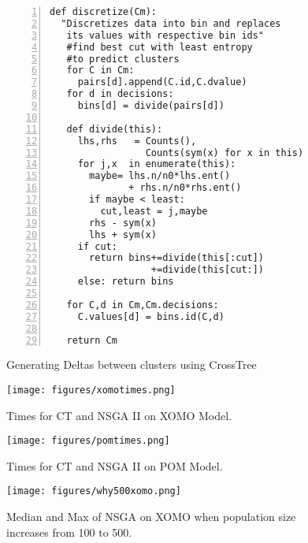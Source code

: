 \documentclass[11pt,twocolumn]{article}
\begin{document}
\begin{figure}[!b]
\begin{center}
\begin{lstlisting}[mathescape,frame=l,numbers=left]
def discretize(Cm):
  "Discretizes data into bin and replaces 
   its values with respective bin ids"
   #find best cut with least entropy 
   #to predict clusters
   for C in Cm:
     pairs[d].append(C.id,C.dvalue)
   for d in decisions:
     bins[d] = divide(pairs[d])

   def divide(this):
     lhs,rhs   = Counts(),
                 Counts(sym(x) for x in this)
     for j,x  in enumerate(this): 
       maybe= lhs.n/n0*lhs.ent()  
              + rhs.n/n0*rhs.ent()
       if maybe < least:
         cut,least = j,maybe
       rhs - sym(x)
       lhs + sym(x)
     if cut:
       return bins+=divide(this[:cut])
                  +=divide(this[cut:])
     else: return bins

   for C,d in Cm,Cm.decisions:
     C.values[d] = bins.id(C,d)

   return Cm
\end{lstlisting}
\end{center}
\caption{Generating Deltas between clusters using CrossTree}
\label{fig:crosstrees}   
\end{figure}


\begin{figure}
\begin{center}
\texttt{[image: figures/xomotimes.png]}
\end{center}
\caption[CT vs. NSGA II XOMO]{ Times for CT and NSGA II on XOMO Model.}
\label{fig:xomotimes}
\end{figure}


\begin{figure}
\begin{center}
\texttt{[image: figures/pomtimes.png]}
\end{center}
\caption[CT vs. NSGA II POM]{ Times for CT and NSGA II on POM Model.}
\label{fig:pomtimes}
\end{figure}


\begin{figure}
\begin{center}
\texttt{[image: figures/why500xomo.png]}
\end{center}
\caption[Why 500 xomo?]{ Median and Max of NSGA on XOMO when population size increases from 100 to 500.}
\label{fig:why500xomo}
\end{figure}
\end{document}
